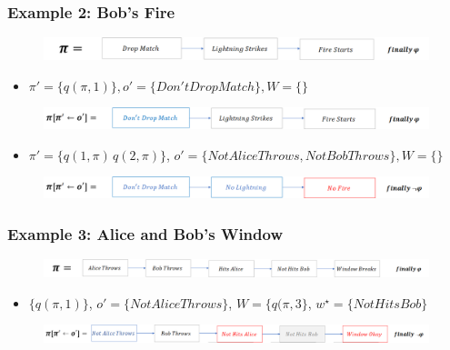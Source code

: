 \documentclass{beamer}
\theoremstyle{plain}
\theoremstyle{definition}
\begin{document}
\begin{frame}
\frametitle{Example 2: Bob's Fire}

\begin{figure}
\includegraphics[scale=.28]{bobPlanOriginal}
\end{figure}

\begin{itemize}
\item $\pi'=\{ q(\pi,1)\}, o'=\{Don't Drop Match\}, W=\{\}$
\end{itemize}
\begin{figure}
\includegraphics[scale=.28]{bobPlanCounterfactual}
\end{figure}

\begin{itemize}
\item $\pi'=\{q(1,\pi)\, q(2,\pi)\}$, $o'=\{Not Alice Throws, Not Bob Throws\}, W=\{\}$
\end{itemize}
\begin{figure}
\includegraphics[scale=.28]{bobPlanCounterfactual2}
\end{figure}

\end{frame}


\begin{frame}
\frametitle{Example 3: Alice and Bob's Window}

\begin{figure}
\includegraphics[scale=.28]{aliceBobPlanOriginal}
\end{figure}

\begin{itemize}
\item $\{q(\pi,1) \}$, $o'=\{Not Alice Throws\}$, $W=\{q(\pi, 3\}$, $w^\star=\{ Not Hits Bob\}$
\end{itemize}
\begin{figure}
\includegraphics[scale=.28]{aliceBobPlanCounterfactual3}
\end{figure}
\end{frame}
\end{document}
